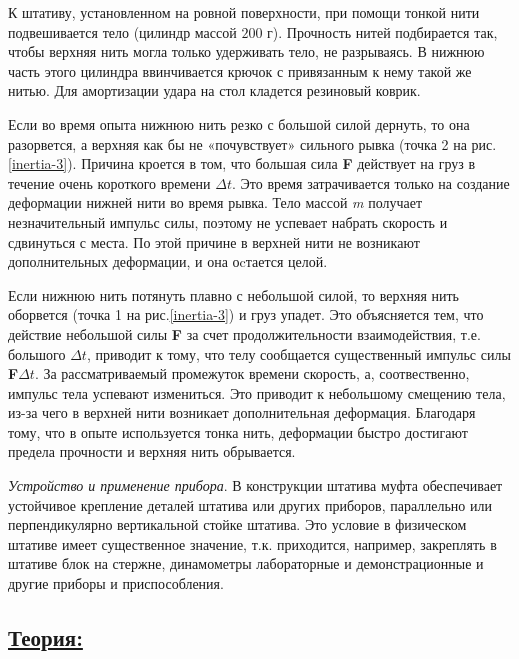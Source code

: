 \documentclass[14pt,a4paper,oneside]{extarticle}	%
\begin{document}
К штативу, установленном на ровной поверхности, при помощи тонкой нити подвешивается тело (цилиндр массой $ 200 $ г).
Прочность нитей подбирается так, чтобы верхняя нить могла только удерживать тело, не разрываясь.
В нижнюю часть этого цилиндра ввинчивается крючок с привязанным к нему такой же нитью.
Для амортизации удара на стол кладется резиновый коврик.

Если во время опыта нижнюю нить резко с большой силой дернуть, то она разорвется, а верхняя как бы не «почувствует» сильного рывка (точка 2 на рис.\ref{inertia-3}). 
Причина кроется в том, что большая сила \textbf{F} действует на груз в течение очень короткого времени $ \Delta t $. 
Это время затрачивается только на создание деформации нижней нити во время рывка. 
Тело массой \textit{m} получает незначительный импульс силы, поэтому не успевает набрать скорость и сдвинуться с места.
По этой причине в верхней нити не возникают дополнительных деформации, и она оcтается целой. 

Если нижнюю нить потянуть плавно с небольшой силой, то верхняя нить оборвется (точка 1 на рис.\ref{inertia-3}) и груз упадет.
Это объясняется тем, что действие небольшой силы \textbf{F} за счет продолжительности взаимодействия, т.е. большого $ \Delta t $, приводит к тому, что телу сообщается существенный импульс силы \textbf{F}$ \Delta t $.
За рассматриваемый промежуток времени скорость, а, соотвественно, импульс тела успевают измениться. 
Это приводит к небольшому смещению тела, из-за чего в верхней нити возникает дополнительная деформация.
Благодаря тому, что в опыте используется тонка нить, деформации быстро достигают предела прочности и верхняя нить обрывается. 

\textit{Устройство и применение прибора}. В конструкции штатива муфта обеспечивает устойчивое крепление деталей штатива или других приборов, параллельно или перпендикулярно вертикальной стойке штатива.
Это условие в физическом штативе имеет существенное значение, т.к. приходится, например, закреплять в штативе блок на стержне, динамометры лабораторные и демонстрационные и другие приборы и приспособления.


\subsection*{\underline{Теория:}}
\end{document}
